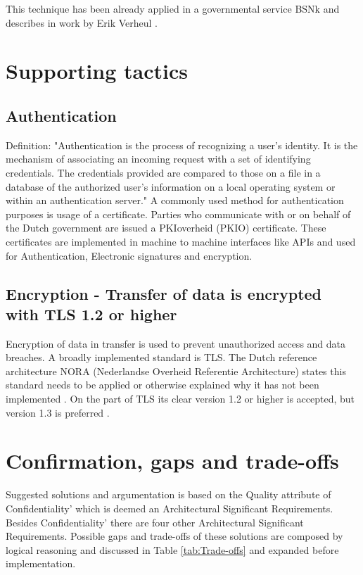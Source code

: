 This technique has been already applied in a governmental service BSNk \cite{Logius_BSNk} and describes in work by Erik Verheul \cite{VerheuleID}.

\section{Supporting tactics}

\subsection{Authentication} \label{authentication}
Definition: "Authentication is the process of recognizing a user’s identity. It is the mechanism of associating an incoming request with a set of identifying credentials. The credentials provided are compared to those on a file in a database of the authorized user’s information on a local operating system or within an authentication server." \cite{authentication}
A commonly used method for authentication purposes is usage of a certificate. Parties who communicate with or on behalf of the Dutch government are issued a PKIoverheid (PKIO) certificate. These certificates are implemented in machine to machine interfaces like APIs and used for Authentication, Electronic signatures and encryption. \cite{Logius_PKIO}

\subsection{Encryption - Transfer of data is encrypted with TLS 1.2 or higher} \label{encryption}
Encryption of data in transfer is used to prevent unauthorized access and data breaches. A broadly implemented standard is TLS. The Dutch reference architecture NORA (Nederlandse Overheid Referentie Architecture) \cite{NORA} states this standard needs to be applied or otherwise explained why it has not been implemented \cite{NORA_PasToeOfLegUit}. On the part of TLS its clear version 1.2 or higher is accepted, but version 1.3 is preferred \cite{NORA_TLS}. 

\section{Confirmation, gaps and trade-offs}
Suggested solutions and argumentation is based on the Quality attribute of Confidentiality' which is deemed an Architectural Significant Requirements. Besides Confidentiality' there are four other Architectural Significant Requirements. Possible gaps and trade-offs of these solutions are composed by logical reasoning and discussed in Table \ref{tab:Trade-offs} and expanded before implementation.

